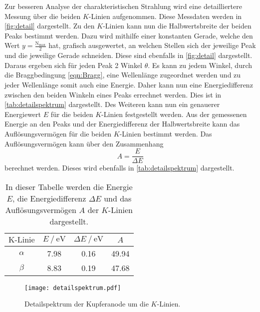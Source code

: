 Zur besseren Analyse der charakteristischen Strahlung wird eine detailliertere Messung über die beiden $K$-Linien aufgenommen. Diese Messdaten werden in \autoref{fig:detail}
dargestellt. Zu den $K$-Linien kann nun die Halbwertsbreite der beiden Peaks bestimmt werden. Dazu wird mithilfe einer konstanten Gerade, welche
den Wert $y = \frac{\text{N}_{\text{max}}}{2}$ hat, grafisch ausgewertet, an welchen Stellen sich der jeweilige Peak und die jeweilige Gerade schneiden. Diese sind 
ebenfalls in \autoref{fig:detail} dargestellt. Daraus ergeben sich für jeden Peak 2 Winkel $\theta$. Es kann zu jedem Winkel, durch die Braggbedingung \eqref{eqn:Bragg},
eine Wellenlänge zugeordnet werden und zu jeder Wellenlänge somit auch eine Energie. Daher kann nun eine Energiedifferenz zwischen den beiden Winkeln eines Peaks errechnet werden.
Dies ist in \autoref{tab:detailspektrum} dargestellt. Des Weiteren kann nun ein genauerer Energiewert $E$ für die beiden $K$-Linien festgestellt werden. 
Aus der gemessenen Energie an den Peaks und der Energiedifferenz der Halbwertsbreite kann das Auflösungsvermögen für die beiden $K$-Linien bestimmt werden.
Das Auflösungsvermögen kann über den Zusammenhang 
\begin{equation*}
    A = \frac{E}{\Delta E}
\end{equation*}
berechnet werden. Dieses wird ebenfalls in \autoref{tab:detailspektrum} dargestellt.
\begin{table}
    \centering
    \caption{In dieser Tabelle werden die Energie $E$, die Energiedifferenz $\Delta E$ und das Auflösungsvermögen $A$ der $K$-Linien dargestellt.}
    \label{tab:detailspektrum}
    \begin{tabular}{c S[table-format = 1.2] S[table-format = 1.2] S[table-format = 2.2]}
      \toprule
       {$\text{K-Linie}$} & {$E \mathbin{/} \unit{\electronvolt}$} & {$\Delta E \mathbin{/} \unit{\electronvolt}$} & {$A$}\\
      \midrule
        {$\alpha$} & 7.98 & 0.16 & 49.94 \\
        {$\beta$}  & 8.83 & 0.19 & 47.68 \\
      \bottomrule
    \end{tabular}
\end{table}

\begin{figure}  
    \centering
    \texttt{[image: detailspektrum.pdf]}
    \caption{Detailspektrum der Kupferanode um die $K$-Linien.}
    \label{fig:detail}
\end{figure}

